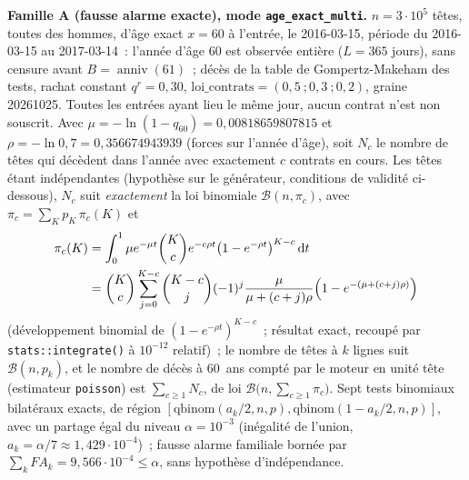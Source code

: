 \documentclass[a4paper,11pt]{article}
\newcommand{\code}[1]{\texttt{\small #1}}
\begin{document}
\medskip
\noindent
\textbf{Famille A (fausse alarme exacte), mode \code{age\_exact\_multi}.}
$n = 3 \cdot 10^{5}$ têtes, toutes des hommes, d'âge exact $x = 60$ à
l'entrée, le 2016-03-15, période du 2016-03-15 au 2017-03-14~: l'année
d'âge 60 est observée entière ($L = 365$ jours), sans censure avant
$B = \operatorname{anniv}(61)$~; décès de la table de Gompertz-Makeham des
tests, rachat constant $q^{r} = 0{,}30$, $\text{loi\_contrats} =
(0{,}5~; 0{,}3~; 0{,}2)$, graine 20261025. Toutes les entrées ayant lieu le
même jour, aucun contrat n'est non souscrit. Avec
$\mu = -\ln(1 - q_{60}) = 0{,}00818659807815$ et
$\rho = -\ln 0{,}7 = 0{,}356674943939$ (forces sur l'année d'âge), soit
$N_c$ le nombre de têtes qui décèdent dans l'année avec exactement $c$
contrats en cours. Les têtes étant indépendantes (hypothèse sur le
générateur, conditions de validité ci-dessous), $N_c$ suit
\emph{exactement} la loi binomiale $\mathcal{B}(n, \pi_c)$, avec
$\pi_c = \sum_K p_K\, \pi_c(K)$ et
\begin{align*}
  \pi_c(K) &= \int_0^1 \mu e^{-\mu t} \binom{K}{c} e^{-c \rho t}
  \bigl(1 - e^{-\rho t}\bigr)^{K-c} \,\mathrm{d}t \\
  &= \binom{K}{c} \sum_{j=0}^{K-c} \binom{K-c}{j} (-1)^{j}
  \frac{\mu}{\mu + (c+j)\rho}\Bigl(1 - e^{-(\mu + (c+j)\rho)}\Bigr)
\end{align*}
(développement binomial de $(1 - e^{-\rho t})^{K-c}$~; résultat exact,
recoupé par \code{stats::integrate()} à $10^{-12}$ relatif)~; le nombre de
têtes à $k$ lignes suit $\mathcal{B}(n, p_k)$, et le nombre de décès à
60~ans compté par le moteur en unité tête (estimateur \code{poisson}) est
$\sum_{c \ge 1} N_c$, de loi $\mathcal{B}\bigl(n, \sum_{c \ge 1}
\pi_c\bigr)$. Sept tests binomiaux bilatéraux exacts, de région
$[\text{qbinom}(a_k/2, n, p), \text{qbinom}(1 - a_k/2, n, p)]$, avec un
partage égal du niveau $\alpha = 10^{-3}$ (inégalité de l'union,
$a_k = \alpha/7 \approx 1{,}429 \cdot 10^{-4}$)~; fausse alarme familiale
bornée par $\sum_k FA_k = 9{,}566 \cdot 10^{-4} \le \alpha$, sans
hypothèse d'indépendance.
\end{document}
